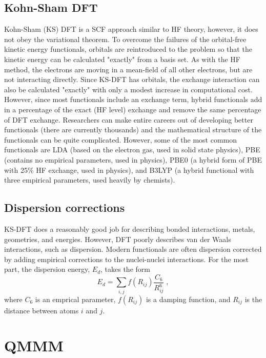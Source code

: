 \documentclass[12pt]{report}
\begin{document}
\subsection{Kohn-Sham DFT}

Kohn-Sham (KS) DFT is a SCF approach similar to HF theory, however, it does
not obey the variational theorem.
To overcome the failures of the orbital-free kinetic energy functionals,
orbitals are reintroduced to the problem so that the kinetic energy can be
calculated "exactly" from a basis set.
As with the HF method, the electrons are moving in a mean-field of all other
electrons, but are not interacting directly.
Since KS-DFT has orbitals, the exchange interaction can also be calculated
"exactly" with only a modest increase in computational cost.
However, since most functionals include an exchange term, hybrid functionals
add in a percentage of the exact (HF level) exchange and remove the same
percentage of DFT exchange.
Researchers can make entire careers out of developing better functionals
(there are currently thousands) and the mathematical structure of the
functionals can be quite complicated.
However, some of the most common functionals are LDA (based on the electron
gas, used in solid state physics), PBE (contains no empirical parameters, used
in physics), PBE0 (a hybrid form of PBE with 25\% HF exchange, used in
physics), and B3LYP (a hybrid functional with three empirical parameters, used
heavily by chemists).

\subsection{Dispersion corrections}

KS-DFT does a reasonably good job for describing bonded interactions, metals,
geometries, and energies.
However, DFT poorly describes van der Waals interactions, such as dispersion.
Modern functionals are often dispersion corrected by adding empirical
corrections to the nuclei-nuclei interactions.
For the most part, the dispersion energy, $E_d$, takes the form
\begin{equation}
 E_d = \sum_{i,j} f(R_{ij})\frac{C_6}{R_{ij}^6} \; ,
\end{equation}
where $C_6$ is an emprical parameter, $f(R_{ij})$ is a damping function, and
$R_{ij}$ is the distance between atoms $i$ and $j$.

\section{QMMM}
 \label{sec:QMMMSim}
\end{document}
